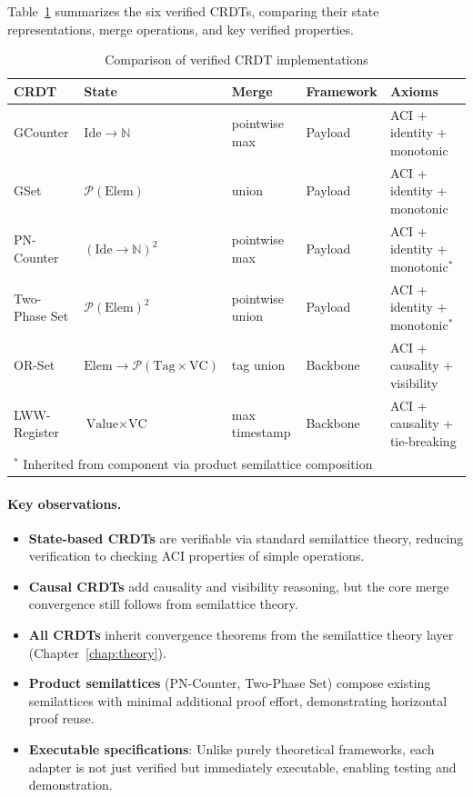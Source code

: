 Table~\ref{tab:crdt-comparison} summarizes the six verified CRDTs, comparing their state representations, merge operations, and key verified properties.

\begin{table}[t]
  \centering
  \caption{Comparison of verified CRDT implementations}
  \label{tab:crdt-comparison}
  \small
  \begin{tabular}{lllll}
    \toprule
    \textbf{CRDT} & \textbf{State} & \textbf{Merge} & \textbf{Framework} & \textbf{Axioms}\\
    \midrule
    GCounter & $\text{Ide} \to \mathbb{N}$ & pointwise max & Payload & ACI + identity + monotonic\\
    GSet & $\mathcal{P}(\text{Elem})$ & union & Payload & ACI + identity + monotonic\\
    PN-Counter & $(\text{Ide} \to \mathbb{N})^2$ & pointwise max & Payload & ACI + identity + monotonic$^*$\\
    Two-Phase Set & $\mathcal{P}(\text{Elem})^2$ & pointwise union & Payload & ACI + identity + monotonic$^*$\\
    OR-Set & $\text{Elem} \to \mathcal{P}(\text{Tag} \times \text{VC})$ & tag union & Backbone & ACI + causality + visibility\\
    LWW-Register & $\text{Value} \times \text{VC}$ & max timestamp & Backbone & ACI + causality + tie-breaking\\
    \bottomrule
    \multicolumn{5}{l}{\small $^*$ Inherited from component via product semilattice composition}
  \end{tabular}
\end{table}

\paragraph{Key observations.}
\begin{itemize}
  \item \textbf{State-based CRDTs} are verifiable via standard semilattice theory, reducing verification to checking ACI properties of simple operations.
  \item \textbf{Causal CRDTs} add causality and visibility reasoning, but the core merge convergence still follows from semilattice theory.
  \item \textbf{All CRDTs} inherit convergence theorems from the semilattice theory layer (Chapter~\ref{chap:theory}).
  \item \textbf{Product semilattices} (PN-Counter, Two-Phase Set) compose existing semilattices with minimal additional proof effort, demonstrating horizontal proof reuse.
  \item \textbf{Executable specifications}: Unlike purely theoretical frameworks, each adapter is not just verified but immediately executable, enabling testing and demonstration.
\end{itemize}

